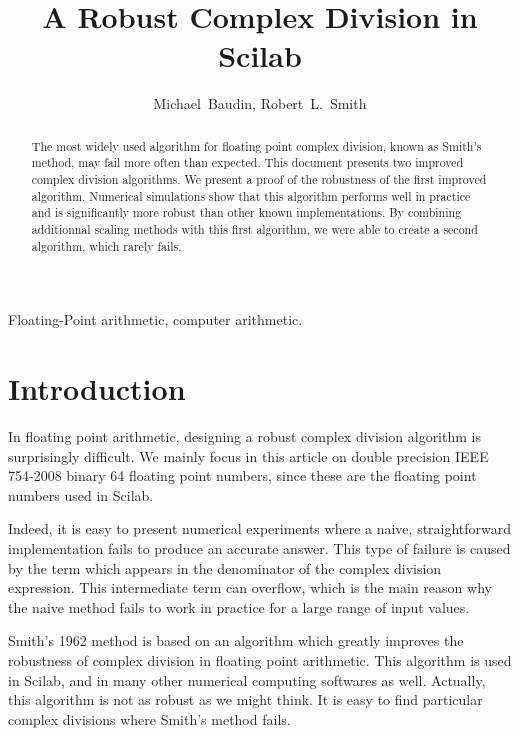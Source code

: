 \documentclass{paper}
\begin{document}
\title{A Robust Complex Division in Scilab}


\author{Michael~Baudin,
        Robert~L.~Smith}

\maketitle


\begin{abstract}
The most widely used algorithm for floating point 
complex division, known as Smith's method, may fail more often than expected. 
This document presents two improved complex 
division algorithms. 
We present a proof of the robustness of the first improved 
algorithm. 
Numerical simulations show that this algorithm performs 
well in practice and is significantly more robust  
than other known implementations. 
By combining additionnal scaling methods with this first 
algorithm, we were able to create a second algorithm, 
which rarely fails.
\end{abstract}

\begin{keywords}
Floating-Point arithmetic, computer arithmetic.
\end{keywords}


\section{Introduction}

In floating point arithmetic, designing a robust complex division 
algorithm is surprisingly difficult. 
We mainly focus in this article on double precision IEEE 754-2008 
binary 64 floating point numbers, since these are the floating point 
numbers used in Scilab.

Indeed, it is easy to present numerical experiments where a 
naive, straightforward implementation fails to produce 
an accurate answer. 
This type of failure is caused by the 
 term which appears in the denominator of 
the complex division expression. 
This intermediate term can overflow, which is the main 
reason why the naive method fails to work in practice for 
a large range of input values. 

Smith's 1962 method \cite{Smith1962} is based on an algorithm which 
greatly improves the robustness of complex  
division in floating point arithmetic. 
This algorithm is used in Scilab, and in many other numerical 
computing softwares as well. 
Actually, this algorithm is not as robust as we might 
think. 
It is easy to find particular complex divisions where 
Smith's method fails. 
\end{document}
